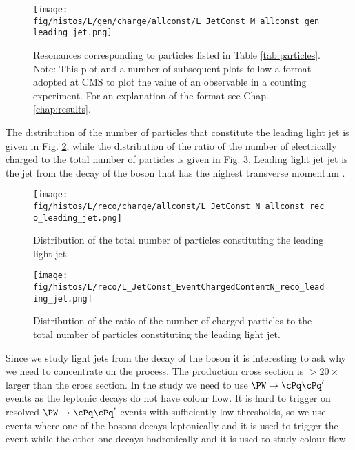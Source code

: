   \begin{figure}[hbtp]
    \centering
    \def\twidth{0.45}
    \texttt{[image: fig/histos/L/gen/charge/allconst/L\_JetConst\_M\_allconst\_gen\_leading\_jet.png]}
    \caption{Resonances corresponding to particles listed in Table \protect\ref{tab:particles}.\\
    \footnotesize Note: This plot and a number of subsequent plots follow a format adopted at CMS to plot the value of an observable in a counting experiment. For an explanation of the format see Chap. \protect\ref{chap:results}.}
    \label{fig:mass_resonances}
  \end{figure}

  The distribution of the number of particles that constitute the leading light jet is given in Fig. \ref{fig:number}, while the distribution of the ratio of the number of electrically charged to the total number of particles is given in Fig. \ref{fig:charged_content}. Leading light jet jet is the jet from the decay of the \PW boson that has the highest transverse momentum \pt.

  \begin{figure}[hbtp]
    \centering
    \def\twidth{0.45}
    \texttt{[image: fig/histos/L/reco/charge/allconst/L\_JetConst\_N\_allconst\_reco\_leading\_jet.png]}
    \caption{Distribution of the total number of particles constituting the leading light jet.}
    \label{fig:number}

\end{figure}
     \begin{figure}[hbtp]
     \centering
     \def\twidth{0.45}
     \texttt{[image: fig/histos/L/reco/L\_JetConst\_EventChargedContentN\_reco\_leading\_jet.png]}
     \caption{Distribution of the ratio of the number of charged particles to the total number of particles constituting the leading light jet.}
  \label{fig:charged_content}
   \end{figure}

Since we study light jets from the decay of the \PW boson it is interesting to ask why we need to concentrate on the \ttbar process. The \PW production cross section is $>20\times$ larger than the \ttbar cross section. In the study we need to use  $\PW\rightarrow \cPq\cPq'$ events as the leptonic decays do not have colour flow. It is hard to trigger on resolved $\PW\rightarrow \cPq\cPq'$ events with sufficiently low \pt thresholds, so we use \ttbar events where one of the \PW bosons decays leptonically and it is used to trigger the event while the other one decays hadronically and it is used to study colour flow.

